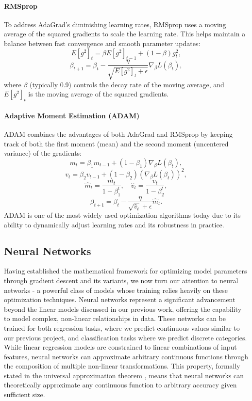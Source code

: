 \documentclass[aps,pra,english,notitlepage,reprint,nofootinbib]{revtex4-1}  %
\begin{document}
\paragraph*{RMSprop}
To address AdaGrad's diminishing learning rates, RMSprop uses a moving average of the squared gradients to scale the learning rate. This helps maintain a balance between fast convergence and smooth parameter updates:
\[
    E[g^2]_t = \beta E[g^2]_{t-1} + (1 - \beta) g_t^2,
\]
\[
    \beta_{t+1} = \beta_t - \frac{\eta}{\sqrt{E[g^2]_t + \epsilon}} \nabla_\beta L(\beta_t),
\]
where \( \beta \) (typically 0.9) controls the decay rate of the moving average, and \( E[g^2]_t \) is the moving average of the squared gradients.

\paragraph*{Adaptive Moment Estimation (ADAM)}
ADAM combines the advantages of both AdaGrad and RMSprop by keeping track of both the first moment (mean) and the second moment (uncentered variance) of the gradients:
\[
    m_t = \beta_1 m_{t-1} + (1 - \beta_1) \nabla_\beta L(\beta_t),
\]
\[
    v_t = \beta_2 v_{t-1} + (1 - \beta_2) (\nabla_\beta L(\beta_t))^2,
\]
\[
    \hat{m}_t = \frac{m_t}{1 - \beta_1^t}, \quad \hat{v}_t = \frac{v_t}{1 - \beta_2^t},
\]
\[
    \beta_{t+1} = \beta_t - \frac{\eta}{\sqrt{\hat{v}_t} + \epsilon} \hat{m}_t.
\]
ADAM is one of the most widely used optimization algorithms today due to its ability to dynamically adjust learning rates and its robustness in practice.

\subsection{Neural Networks}

Having established the mathematical framework for optimizing model parameters through gradient descent and its variants, we now turn our attention to neural networks - a powerful class of models whose training relies heavily on these optimization techniques. Neural networks represent a significant advancement beyond the linear models discussed in our previous work, offering the capability to model complex, non-linear relationships in data. These networks can be trained for both regression tasks, where we predict continuous values similar to our previous project, and classification tasks where we predict discrete categories. While linear regression models are constrained to linear combinations of input features, neural networks can approximate arbitrary continuous functions through the composition of multiple non-linear transformations. This property, formally stated in the universal approximation theorem \cite{uniapproxtheorem}, means that neural networks can theoretically approximate any continuous function to arbitrary accuracy given sufficient size.
\end{document}
